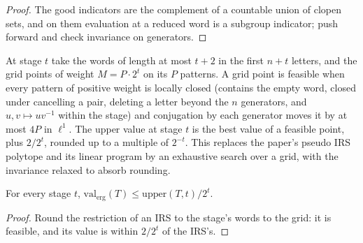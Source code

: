 \begin{proof}
\leanok
The good indicators are the complement of a countable union of clopen sets, and on them
evaluation at a reduced word is a subgroup indicator; push forward and check invariance on
generators.
\end{proof}

\begin{definition}
\label{def:pseudo-subgroup-polytope}
\leanok
At stage $t$ take the words of length at most $t+2$ in the first $n+t$ letters, and the grid
points of weight $M = P \cdot 2^t$ on its $P$ patterns. A grid point is feasible when every
pattern of positive weight is locally closed (contains the empty word, closed under cancelling a
pair, deleting a letter beyond the $n$ generators, and $u, v \mapsto u v^{-1}$ within the stage)
and conjugation by each generator moves it by at most $4P$ in $\ell^1$. The upper value at stage
$t$ is the best value of a feasible point, plus $2/2^t$, rounded up to a multiple of $2^{-t}$.
This replaces the paper's pseudo IRS polytope and its linear program by an exhaustive search over
a grid, with the invariance relaxed to absorb rounding.
\end{definition}

\begin{lemma}
\label{lem:erg-le-upper}
\leanok
For every stage $t$, $\mathrm{val}_{\mathrm{erg}}(T) \leq \mathrm{upper}(T, t)/2^t$.
\end{lemma}

\begin{proof}
\leanok
Round the restriction of an IRS to the stage's words to the grid: it is feasible, and its value
is within $2/2^t$ of the IRS's.
\end{proof}

